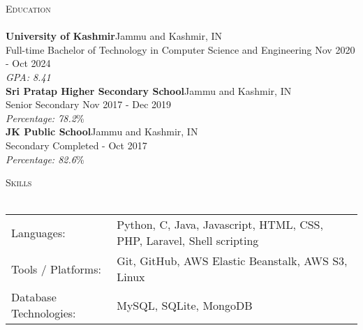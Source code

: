 \documentclass[a4paper]{article}
\newcommand{\lineunder} {
    \vspace*{-8pt} \\
    \hspace*{-18pt} \hrulefill \\
}
\newcommand{\header} [1] {
    {\hspace*{-18pt}\vspace*{6pt} \textsc{#1}}
    \vspace*{-6pt} \lineunder
}
\begin{document}
      \header{Education}
      \vspace{2mm}
      \textbf{University of Kashmir}\hfill Jammu and Kashmir, IN\\
Full-time Bachelor of Technology in Computer Science and Engineering \hfill Nov 2020 - Oct 2024\\
{\sl GPA: 8.41}\\
\vspace{2mm}
      \textbf{Sri Pratap Higher Secondary School}\hfill Jammu and Kashmir, IN\\
Senior Secondary \hfill Nov 2017 - Dec 2019\\
{\sl Percentage: 78.2}\%\\
\vspace{2mm}
      \textbf{JK Public School}\hfill Jammu and Kashmir, IN\\
Secondary \hfill Completed - Oct 2017\\
{\sl Percentage: 82.6}\%\\
\vspace{2mm}



%
%
  \header{Skills}
  \vspace{2mm}
  \begin{longtable}{p{4cm}p{12cm}}
  Languages: & Python, C, Java, Javascript, HTML, CSS, PHP, Laravel, Shell scripting \\
  Tools / Platforms: & Git, GitHub, AWS Elastic Beanstalk, AWS S3, Linux \\
  Database Technologies: & MySQL, SQLite, MongoDB \\
  \end{longtable}
  \vspace{1mm}
\end{document}
